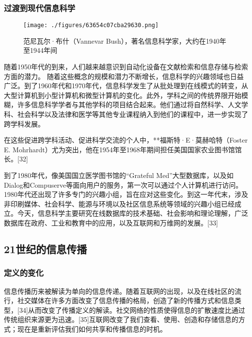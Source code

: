 \subsubsection{过渡到现代信息科学}
\begin{figure}[ht]
\centering
\texttt{[image: ./figures/63654c07cba29630.png]}
\caption{范尼瓦尔·布什（Vannevar Bush），著名信息科学家，大约在1940年至1944年间} \label{fig_INCE_4}
\end{figure}
随着1950年代的到来，人们越来越意识到自动化设备在文献检索和信息存储与检索方面的潜力。  
随着这些概念的规模和潜力不断增长，信息科学的兴趣领域也日益广泛。到了1960年代和1970年代，信息科学发生了从批处理到在线模式的转变，从大型计算机到小型计算机和微型计算机的变化。此外，学科之间的传统界限开始模糊，许多信息科学学者与其他学科的项目结合起来。他们通过将自然科学、人文学科、社会科学以及法律和医学等其他专业课程纳入到他们的课程中，进一步实现了跨学科发展。

在这些促进跨学科活动、促进科学交流的个人中，**福斯特·E·莫赫哈特（Foster E. Mohrhardt）尤为突出，他在1954年至1968年期间担任美国国家农业图书馆馆长。[32]

到了1980年代，像美国国立医学图书馆的“Grateful Med”大型数据库，以及如Dialog和Compuserve等面向用户的服务，第一次可以通过个人计算机进行访问。1980年代还出现了许多专门的兴趣小组，旨在应对这些变化。到这一年代末，涉及非印刷媒体、社会科学、能源与环境以及社区信息系统等领域的兴趣小组已经成立。今天，信息科学主要研究在线数据库的技术基础、社会影响和理论理解，广泛数据库在政府、工业和教育中的应用，以及互联网和万维网的发展。[33]
\subsection{21世纪的信息传播}
\subsubsection{定义的变化} 
信息传播历来被解读为单向的信息传递。随着互联网的出现，以及在线社区的流行，社交媒体在许多方面改变了信息传播的格局，创造了新的传播方式和信息类型，[34]从而改变了传播定义的解读。社交网络的性质使得信息的扩散速度比通过传统组织来源更为迅速。[35]互联网改变了我们查看、使用、创造和存储信息的方式；现在是重新评估我们如何共享和传播信息的时机。
